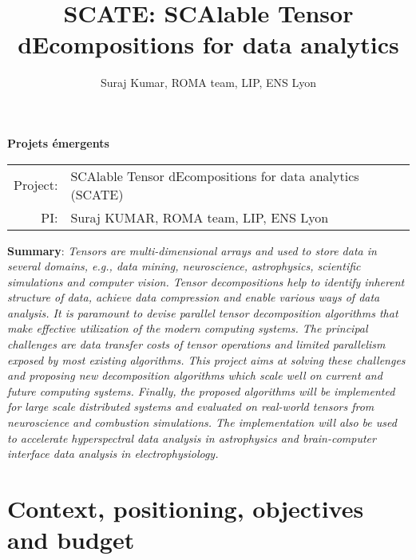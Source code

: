 \documentclass[a4paper,11pt]{article}
\title{SCATE: SCAlable Tensor dEcompositions for data analytics}
\author{Suraj Kumar, ROMA team, LIP, ENS Lyon}
\date{}
\author{}
\date{}
\begin{document}
	
	\begin{center}
		\Large\textbf{Projets émergents}
	\end{center}
	
	\begin{tabular}{rl}
		Project: & {\sc SCAlable Tensor dEcompositions for data analytics (SCATE)}\\
		PI: & Suraj KUMAR, ROMA team, LIP, ENS Lyon\\
	\end{tabular}\newline


	\textbf{Summary}: \emph{Tensors are multi-dimensional arrays and used to store data in several domains, e.g., data mining, neuroscience, astrophysics, scientific simulations and computer vision. Tensor decompositions help to identify inherent structure of data, achieve data compression and enable various ways of data analysis. It is paramount to devise parallel tensor decomposition algorithms that make effective utilization of the modern computing systems. The principal challenges are data transfer costs of tensor operations and limited parallelism exposed by most existing algorithms. This project aims at solving these challenges and proposing new decomposition algorithms which scale well on current and future computing systems. Finally, the proposed algorithms will be implemented for large scale distributed systems and evaluated on real-world tensors from neuroscience and combustion simulations. The implementation will also be used to accelerate hyperspectral data analysis in astrophysics and brain-computer interface data analysis in electrophysiology.}
	
	\section*{Context, positioning, objectives and budget}
	
\end{document}
